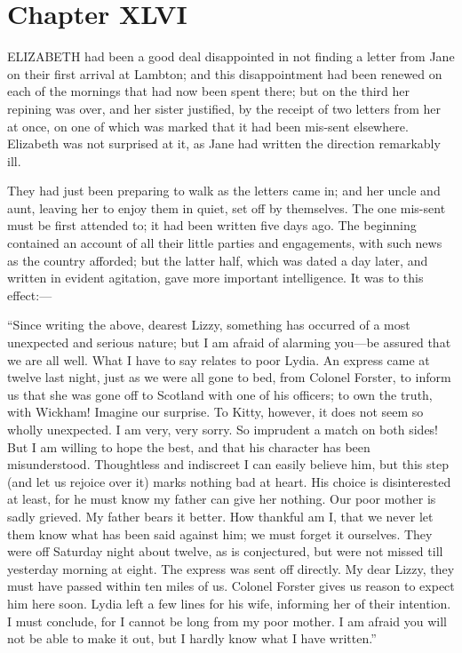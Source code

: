 \documentclass[12pt,openright]{book}
\begin{document}
\chapter{Chapter XLVI}

\noindent ELIZABETH had been a good deal disappointed in not finding a letter from Jane on their first arrival at Lambton; and this disappointment had been renewed on each of the mornings that had now been spent there; but on the third her repining was over, and her sister justified, by the receipt of two letters from her at once, on one of which was marked that it had been mis-sent elsewhere. Elizabeth was not surprised at it, as Jane had written the direction remarkably ill.

They had just been preparing to walk as the letters came in; and her uncle and aunt, leaving her to enjoy them in quiet, set off by themselves. The one mis-sent must be first attended to; it had been written five days ago. The beginning contained an account of all their little parties and engagements, with such news as the country afforded; but the latter half, which was dated a day later, and written in evident agitation, gave more important intelligence. It was to this effect:—

“Since writing the above, dearest Lizzy, something has occurred of a most unexpected and serious nature; but I am afraid of alarming you—be assured that we are all well. What I have to say relates to poor Lydia. An express came at twelve last night, just as we were all gone to bed, from Colonel Forster, to inform us that she was gone off to Scotland with one of his officers; to own the truth, with Wickham! Imagine our surprise. To Kitty, however, it does not seem so wholly unexpected. I am very, very sorry. So imprudent a match on both sides! But I am willing to hope the best, and that his character has been misunderstood. Thoughtless and indiscreet I can easily believe him, but this step (and let us rejoice over it) marks nothing bad at heart. His choice is disinterested at least, for he must know my father can give her nothing. Our poor mother is sadly grieved. My father bears it better. How thankful am I, that we never let them know what has been said against him; we must forget it ourselves. They were off Saturday night about twelve, as is conjectured, but were not missed till yesterday morning at eight. The express was sent off directly. My dear Lizzy, they must have passed within ten miles of us. Colonel Forster gives us reason to expect him here soon. Lydia left a few lines for his wife, informing her of their intention. I must conclude, for I cannot be long from my poor mother. I am afraid you will not be able to make it out, but I hardly know what I have written.”
\end{document}
